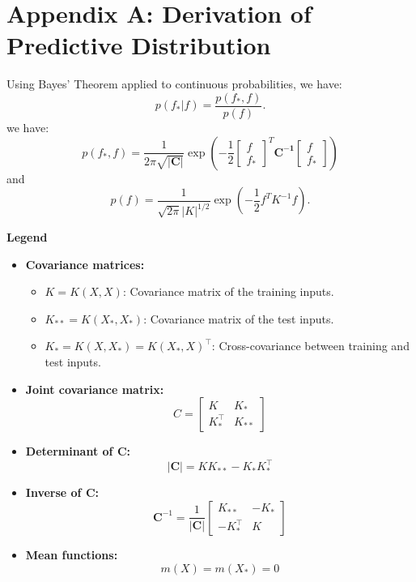 \documentclass{article}
\begin{document}
\appendix

\section{Appendix A: Derivation of Predictive Distribution}
\label{appendix:A}
Using Bayes' Theorem applied to continuous probabilities, we have:
\[
p(f_* | f) = \frac{p(f_*, f)}{p(f)}.
\]
we have:
$$p(f_*,f) = \frac{1}{2\pi\sqrt{\mathbf{|C|}}}\exp \left(-\frac{1}{2} 
\begin{bmatrix} f \\ f_*  \end{bmatrix}^T\mathbf{C^{-1}}\begin{bmatrix} f  \\ f_* \end{bmatrix}\right)$$
and 
\[
p(f) = \frac{1}{\sqrt{2\pi} |K|^{1/2}}
\exp \left(-\frac{1}{2} f^T K^{-1} f \right).
\]

\noindent
\textbf{Legend}
\begin{itemize}
    \item \textbf{Covariance matrices:}
    \begin{itemize}
        \item \( K = K(X, X) \): Covariance matrix of the training inputs.
        \item \( K_{**} = K(X_*, X_*) \): Covariance matrix of the test inputs.
        \item \( K_* = K(X, X_*) = K(X_*, X)^\top \): Cross-covariance between training and test inputs.
    \end{itemize}
    
    \item \textbf{Joint covariance matrix:}
    \[
    C = \begin{bmatrix}
    K & K_* \\
    K_*^\top & K_{**}
    \end{bmatrix}
    \]
    
    \item \textbf{Determinant of \( \mathbf{C} \):}
    \[
    |\mathbf{C}| = K K_{**} - K_* K_*^\top
    \]
    
    \item \textbf{Inverse of \( \mathbf{C} \):}
    \[
    \mathbf{C}^{-1} = \frac{1}{|\mathbf{C}|}
    \begin{bmatrix}
    K_{**} & -K_* \\
    -K_*^\top & K
    \end{bmatrix}
    \]
    
    \item \textbf{Mean functions:}
    \[
    m(X) = m(X_*) = 0
    \]
\end{itemize}
\end{document}
